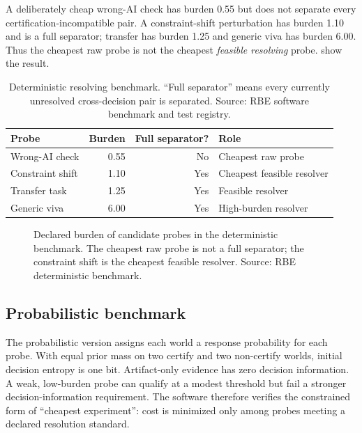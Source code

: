 \documentclass[11pt]{article}
\begin{document}
A deliberately cheap wrong-AI check has burden 0.55 but does not separate every certification-incompatible pair. A constraint-shift perturbation has burden 1.10 and is a full separator; transfer has burden 1.25 and generic viva has burden 6.00. Thus the cheapest raw probe is not the cheapest \emph{feasible resolving} probe.  show the result.

\begin{table}[t]
\centering
\caption{Deterministic resolving benchmark. ``Full separator'' means every currently unresolved cross-decision pair is separated. Source: RBE software benchmark and test registry.}
\label{tab:deterministic}
\begin{tabular}{lrrl}
\toprule
Probe & Burden & Full separator? & Role \\
\midrule
Wrong-AI check & 0.55 & No & Cheapest raw probe \\
Constraint shift & 1.10 & Yes & Cheapest feasible resolver \\
Transfer task & 1.25 & Yes & Feasible resolver \\
Generic viva & 6.00 & Yes & High-burden resolver \\
\bottomrule
\end{tabular}
\end{table}

\begin{figure}[t]
\centering
{}
\caption{Declared burden of candidate probes in the deterministic benchmark. The cheapest raw probe is not a full separator; the constraint shift is the cheapest feasible resolver. Source: RBE deterministic benchmark.}
\label{fig:detburden}
\end{figure}

\subsection{Probabilistic benchmark}
The probabilistic version assigns each world a response probability for each probe. With equal prior mass on two certify and two non-certify worlds, initial decision entropy is one bit. Artifact-only evidence has zero decision information. A weak, low-burden probe can qualify at a modest threshold but fail a stronger decision-information requirement. The software therefore verifies the constrained form of ``cheapest experiment'': cost is minimized only among probes meeting a declared resolution standard.
\end{document}
